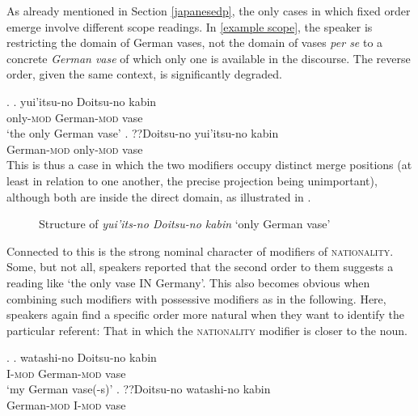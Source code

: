 As already mentioned in Section \ref{japanesedp}, the only cases in which fixed order emerge involve different scope readings. In \ref{example scope}, the speaker is restricting the domain of German vases, not the domain of vases \textit{per se} to a concrete \textit{German vase} of which only one is available in the discourse. The reverse order, given the same context, is significantly degraded.

\ex. \label{example scope} \ag. yui'itsu-no Doitsu-no kabin\\
only-\textsc{mod} German-\textsc{mod} vase\\
`the only German vase'
\bg. ??Doitsu-no yui'itsu-no kabin\\
German-\textsc{mod} only-\textsc{mod} vase\\

This is thus a case in which the two modifiers occupy distinct merge positions (at least in relation to one another, the precise projection being unimportant), although both are inside the direct domain, as illustrated in .

\begin{figure}
\centering
{}
\caption{Structure of \textit{yui’its-no Doitsu-no kabin} `only German vase’}
\label{structure yuiitsu-no doitsu-no}
\end{figure}

Connected to this is the strong nominal character of modifiers of \textsc{nationality}. Some, but not all, speakers reported that the second order to them suggests a reading like `the only vase IN Germany’. This also becomes obvious when combining such modifiers with possessive modifiers as in the following. Here, speakers again find a specific order more natural when they want to identify the particular referent: That in which the \textsc{nationality} modifier is closer to the noun.

\ex. \ag. watashi-no Doitsu-no kabin\\
I-\textsc{mod} German-\textsc{mod} vase\\
`my German vase(-s)’
\bg. ??Doitsu-no watashi-no kabin\\
German-\textsc{mod} I-\textsc{mod} vase\\

